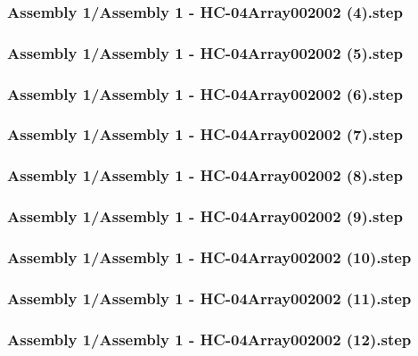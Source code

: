 \documentclass[a4paper,12pt]{article}
\begin{document}
\begin{lstlising}[language=C++]
\subsubsection{Assembly 1/Assembly 1 - HC-04Array002002 (4).step}

\subsubsection{Assembly 1/Assembly 1 - HC-04Array002002 (5).step}

\subsubsection{Assembly 1/Assembly 1 - HC-04Array002002 (6).step}

\subsubsection{Assembly 1/Assembly 1 - HC-04Array002002 (7).step}

\subsubsection{Assembly 1/Assembly 1 - HC-04Array002002 (8).step}

\subsubsection{Assembly 1/Assembly 1 - HC-04Array002002 (9).step}

\subsubsection{Assembly 1/Assembly 1 - HC-04Array002002 (10).step}

\subsubsection{Assembly 1/Assembly 1 - HC-04Array002002 (11).step}

\subsubsection{Assembly 1/Assembly 1 - HC-04Array002002 (12).step}


\end{lstlising}
\end{document}
